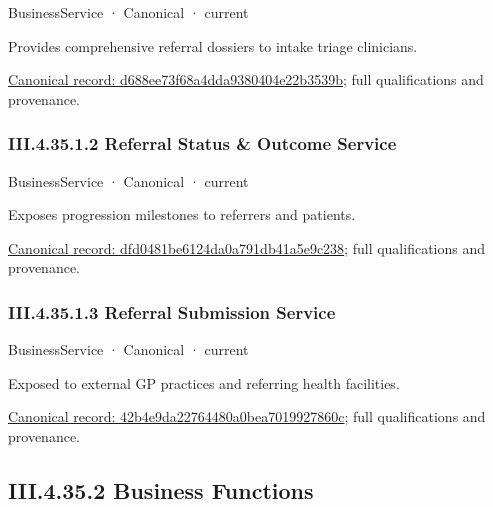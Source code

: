 \label{element:d688ee73f68a4dda9380404e22b3539b}
{\small BusinessService · Canonical · current}\par

Provides comprehensive referral dossiers to intake triage clinicians.


{\footnotesize \href{../../../../continuum/business/business-service/d688ee73f68a4dda9380404e22b3539b.md}{Canonical record: d688ee73f68a4dda9380404e22b3539b}; full qualifications and provenance.}\par
\subsubsection*{III.4.35.1.2 Referral Status \& Outcome Service}
\label{navigation:III.4.35.1.2}

\label{element:dfd0481be6124da0a791db41a5e9c238}
{\small BusinessService · Canonical · current}\par

Exposes progression milestones to referrers and patients.


{\footnotesize \href{../../../../continuum/business/business-service/dfd0481be6124da0a791db41a5e9c238.md}{Canonical record: dfd0481be6124da0a791db41a5e9c238}; full qualifications and provenance.}\par
\subsubsection*{III.4.35.1.3 Referral Submission Service}
\label{navigation:III.4.35.1.3}

\label{element:42b4e9da22764480a0bea7019927860c}
{\small BusinessService · Canonical · current}\par

Exposed to external GP practices and referring health facilities.


{\footnotesize \href{../../../../continuum/business/business-service/42b4e9da22764480a0bea7019927860c.md}{Canonical record: 42b4e9da22764480a0bea7019927860c}; full qualifications and provenance.}\par
\subsection*{III.4.35.2 Business Functions}
\label{navigation:III.4.35.2}

